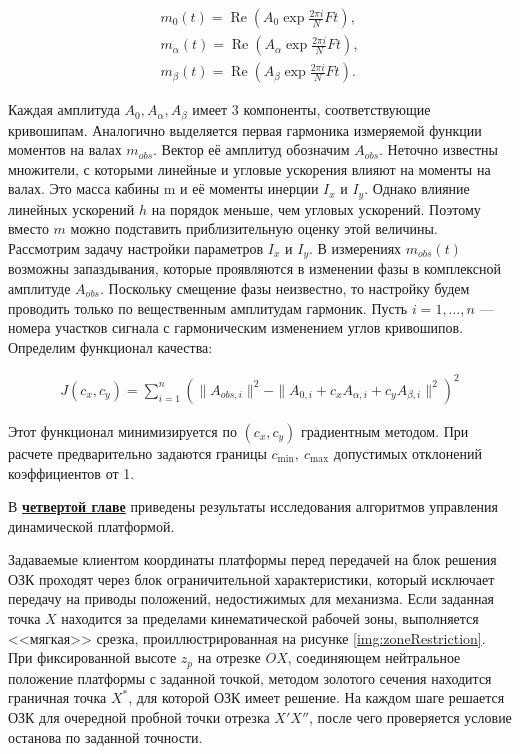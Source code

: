 \begin{equation}
\begin{aligned}
	m_0(t) = \operatorname{Re}\left(A_0 \exp{\frac{2\pi i}{N}Ft}\right),\\
	m_{\alpha}(t) = \operatorname{Re}\left(A_{\alpha} \exp{\frac{2\pi i}{N}Ft}\right),\\
	m_{\beta}(t) = \operatorname{Re}\left(A_{\beta} \exp{\frac{2\pi i}{N}Ft}\right).
\end{aligned}
\end{equation}

Каждая амплитуда $A_0, A_{\alpha}, A_{\beta}$ имеет 3 компоненты, соответствующие кривошипам. Аналогично выделяется первая гармоника измеряемой функции моментов на валах $m_{obs}$. Вектор её амплитуд обозначим $A_{obs}$. Неточно известны множители, с которыми линейные и угловые ускорения влияют на моменты на валах. Это масса кабины m и её моменты инерции $I_x$ и $I_y$. Однако влияние линейных ускорений $h$ на порядок меньше, чем угловых ускорений. Поэтому вместо $m$ можно подставить приблизительную оценку этой величины. Рассмотрим задачу настройки параметров $I_x$ и $I_y$. В измерениях $m_{obs}(t)$ возможны запаздывания, которые проявляются в изменении фазы в комплексной амплитуде $A_{obs}$. Поскольку смещение фазы неизвестно, то настройку будем проводить только по вещественным амплитудам гармоник. Пусть $i = 1,\ldots,n$ — номера участков сигнала с гармоническим изменением углов кривошипов. Определим функционал качества:

\begin{equation}
\begin{aligned}
	J\left(c_x,c_y\right) = \sum^n_{i=1}\left(\|A_{obs,i}\|^2 - \|A_{0,i} + c_xA_{\alpha,i} + c_yA_{\beta,i}\|^2\right)^2
\end{aligned}
\end{equation}

Этот функционал минимизируется по $\left(c_x, c_y\right)$ градиентным методом. При расчете предварительно задаются границы $c_{\min},~c_{\max}$ допустимых отклонений коэффициентов от 1.

В \underline{\textbf{четвертой главе}} приведены результаты исследования алгоритмов управления динамической платформой.

Задаваемые клиентом координаты платформы перед передачей на блок решения ОЗК проходят через блок ограничительной характеристики, который исключает передачу на приводы положений, недостижимых для механизма. Если заданная точка $X$ находится за пределами кинематической рабочей зоны, выполняется <<мягкая>> срезка, проиллюстрированная на рисунке \ref{img:zoneRestriction}. При фиксированной высоте $z_p$ на отрезке $OX$, соединяющем нейтральное положение платформы с заданной точкой, методом золотого сечения находится граничная точка $X^*$, для которой ОЗК имеет решение. На каждом шаге решается ОЗК для очередной пробной точки отрезка $X'X''$, после чего проверяется условие останова по заданной точности.

